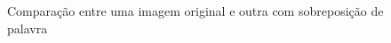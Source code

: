 \documentclass[10pt,a4paper]{article}
\begin{document}
\begin{figure}[h!]
\begin{center}
\caption{Comparação entre uma imagem original e outra com sobreposição
  de palavra}
\end{center}
\end{figure}


\end{document}
